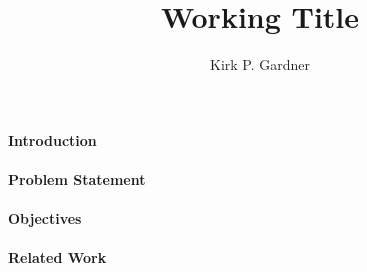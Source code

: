 \documentclass[12pt]{article}
\title{Working Title}
\author{Kirk P. Gardner}
\begin{document}
\paragraph{Introduction}


\paragraph{Problem Statement}


\paragraph{Objectives}


\paragraph{Related Work}





\end{document}
